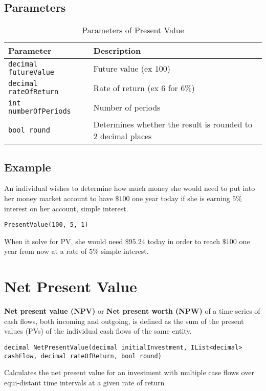 \subsection{Parameters}
\begin{table}[h]
\begin{tabular}{|l|l|}
\hline
\textbf{Parameter} & \textbf{Description}\\
\hline
\verb|decimal futureValue| & Future value (ex $100$)\\
\verb|decimal rateOfReturn| &  Rate of return (ex $6$ for $6\%$)\\
\verb|int numberOfPeriods| & Number of periods\\
\verb|bool round| & Determines whether the result is rounded to $2$ decimal places\\
\hline
\end{tabular}
\caption{Parameters of Present Value}
\end{table}

\subsection{Example}
An individual wishes to determine how much money she would need to put into her money market account to have $\$100$ one year today if she is earning $5\%$ interest on her account, simple interest.
\begin{lstlisting}
PresentValue(100, 5, 1)
\end{lstlisting}
When it solve for PV, she would need $\$95.24$ today in order to reach $\$100$ one year from now at a rate of $5\%$ simple interest.



\section{Net Present Value}
\textbf{Net present value (NPV)} or \textbf{Net present worth (NPW)} of a time series of cash flows, both incoming and outgoing, is defined as the sum of the present values (PVs) of the individual cash flows of the same entity.
\begin{lstlisting}
decimal NetPresentValue(decimal initialInvestment, IList<decimal> cashFlow, decimal rateOfReturn, bool round)
\end{lstlisting}
Calculates the net present value for an investment with multiple case flows over equi-distant time intervals at a given rate of return

